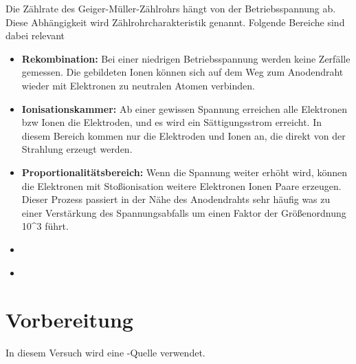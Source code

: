 Die Zählrate des Geiger-Müller-Zählrohrs hängt von der Betriebsspannung ab.
Diese Abhängigkeit wird Zählrohrcharakteristik genannt. 
Folgende Bereiche sind dabei relevant
\begin{itemize}
    \item \textbf{Rekombination:} Bei einer niedrigen Betriebsspannung werden keine Zerfälle gemessen.
    Die gebildeten Ionen können sich auf dem Weg zum Anodendraht wieder mit Elektronen zu neutralen Atomen verbinden.
    \item \textbf{Ionisationskammer:} Ab einer gewissen Spannung erreichen alle Elektronen bzw Ionen die Elektroden, und es wird ein Sättigungsstrom erreicht.
    In diesem Bereich kommen nur die Elektroden und Ionen an, die direkt von der Strahlung erzeugt werden.
    \item \textbf{Proportionalitätsbereich:} Wenn die Spannung weiter erhöht wird, können die Elektronen mit Stoßionisation weitere Elektronen Ionen Paare erzeugen. 
    Dieser Prozess passiert in der Nähe des Anodendrahts sehr häufig was zu einer Verstärkung des Spannungsabfalls um einen Faktor der Größenordnung \num{10^3} führt.
    \item \textbf{} 
    \item \textbf{} 
\end{itemize}


\section{Vorbereitung}
In diesem Versuch wird eine -Quelle verwendet.
